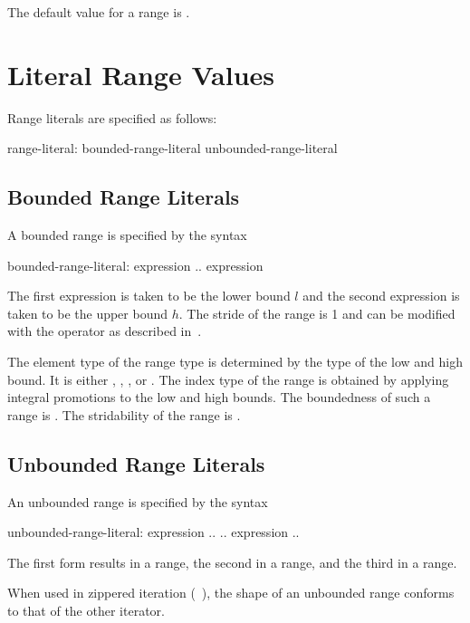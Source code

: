 The default value for a range is .

\section{Literal Range Values}
\label{Range_Literals}

Range literals are specified as follows:
\begin{syntax}
range-literal:
  bounded-range-literal
  unbounded-range-literal
\end{syntax}

\subsection{Bounded Range Literals}
\label{Bounded_Ranges}

A bounded range is specified by the syntax
\begin{syntax}
bounded-range-literal:
  expression .. expression
\end{syntax}
The first expression is taken to be the lower bound $l$ and the second
expression is taken to be the upper bound $h$.  The stride of the
range is 1 and can be modified with the  operator as described
in~.

The element type of the range type is determined by the type of the
low and high bound.  It is either , ,
, or .  The index type of the range is obtained by
applying integral promotions to the low and high bounds.  The boundedness
of such a range is .  The stridability of the range is .

\subsection{Unbounded Range Literals}
\label{Unbounded_Ranges}

An unbounded range is specified by the syntax
\begin{syntax}
unbounded-range-literal:
  expression ..
  .. expression
  ..
\end{syntax}

The first form results in a  range, the
second in a  range, and the third in
a  range.

When used in zippered iteration (~), the shape of an
unbounded range conforms to that of the other iterator.


